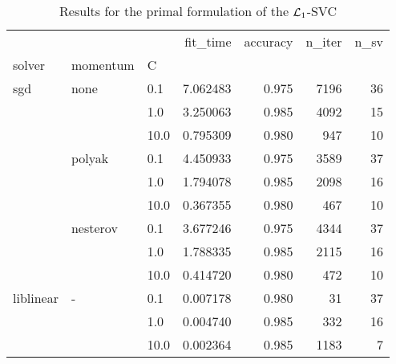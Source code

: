 \begin{table}[H]
\centering
\caption{Results for the primal formulation of the $\protect \mathcal{L}_1$-SVC}
\label{primal_l1_svc_cv_results}
\begin{tabular}{lllrrrr}
\toprule
          &   &      &  fit\_time &  accuracy &  n\_iter &  n\_sv \\
solver & momentum & C &           &           &         &       \\
\midrule
sgd & none & 0.1  &  7.062483 &     0.975 &    7196 &    36 \\
          &   & 1.0  &  3.250063 &     0.985 &    4092 &    15 \\
          &   & 10.0 &  0.795309 &     0.980 &     947 &    10 \\
          & polyak & 0.1  &  4.450933 &     0.975 &    3589 &    37 \\
          &   & 1.0  &  1.794078 &     0.985 &    2098 &    16 \\
          &   & 10.0 &  0.367355 &     0.980 &     467 &    10 \\
          & nesterov & 0.1  &  3.677246 &     0.975 &    4344 &    37 \\
          &   & 1.0  &  1.788335 &     0.985 &    2115 &    16 \\
          &   & 10.0 &  0.414720 &     0.980 &     472 &    10 \\
liblinear & - & 0.1  &  0.007178 &     0.980 &      31 &    37 \\
          &   & 1.0  &  0.004740 &     0.985 &     332 &    16 \\
          &   & 10.0 &  0.002364 &     0.985 &    1183 &     7 \\
\bottomrule
\end{tabular}
\end{table}
